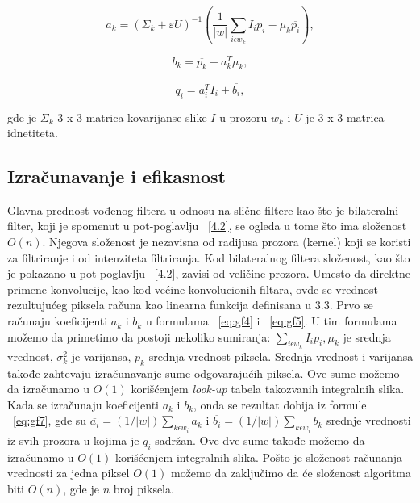 \documentclass[a4paper,12pt,titlepage]{article}
\begin{document}
\begin{equation}\label{eq:gf11}
a_k = (\Sigma_k + \varepsilon U)^{-1} (\dfrac{1}{|w|} \sum_{i \epsilon w_k} I_i p_i - \mu_k \overline{p_i}),
\end{equation}

\begin{equation}\label{eq:gf12}
b_k = \overline{p_k} - a_k^T \mu_k,
\end{equation}

\begin{equation}\label{eq:gf13}
q_i = \overline{a_i^T} I_i + \overline{b_i},
\end{equation}

gde je $\Sigma_k$ 3 x 3 matrica kovarijanse slike $I$ u prozoru $w_k$ i $U$ je 3 x 3 matrica idnetiteta.

\subsection{Izračunavanje i efikasnost}%

Glavna prednost vođenog filtera u odnosu na slične filtere kao što je bilateralni filter, koji je spomenut u pot-poglavlju ~\ref{4.2}, se ogleda u tome što ima složenost $O(n)$. Njegova složenost je nezavisna od radijusa prozora (kernel) koji se koristi za filtriranje i od intenziteta filtriranja. Kod bilateralnog filtera složenost, kao što je pokazano u pot-poglavlju ~\ref{4.2}, zavisi od veličine prozora. Umesto da direktne primene konvolucije, kao kod većine konvolucionih filtara, ovde se vrednost rezultujućeg piksela računa kao linearna funkcija definisana u 3.3. Prvo se računaju koeficijenti $a_k$ i $b_k$ u formulama ~\ref{eq:gf4} i ~\ref{eq:gf5}. U tim formulama možemo da primetimo da postoji nekoliko sumiranja: $\sum_{i \epsilon w_k} I_ip_i, \mu_k$ je srednja vrednost, $\sigma_k^2$ je varijansa, $\overline{p_k}$ srednja vrednost piksela. Srednja vrednost i varijansa takođe zahtevaju izračunavanje sume odgovarajućih piksela. Ove sume možemo da izračunamo u $O(1)$ korišćenjem \emph{look-up} tabela takozvanih integralnih slika. Kada se izračunaju koeficijenti $a_k$ i $b_k$, onda se rezultat dobija iz formule ~\ref{eq:gf7}, 
gde su $\overline{a_i} = (1 / |w|) \sum_{k \epsilon w_i} a_k$ i $\overline{b_i} = (1 / |w|) \sum_{k \epsilon w_i} b_k$ srednje vrednosti iz svih prozora u kojima je $q_i$ sadržan. Ove dve sume takođe možemo da izračunamo u $O(1)$ korišćenjem integralnih slika. Pošto je složenost računanja vrednosti za jedna piksel $O(1)$ možemo da zaključimo da će složenost algoritma biti $O(n)$, gde je $n$ broj piksela.
\end{document}
